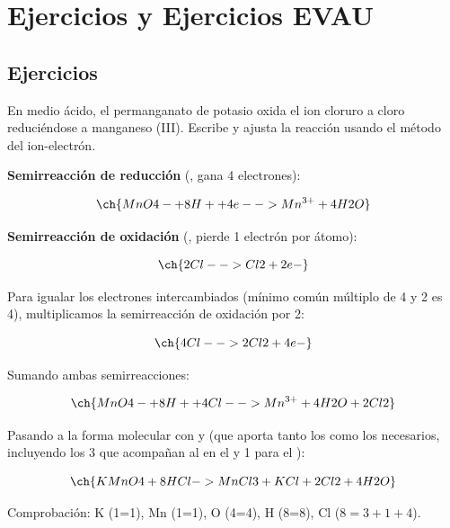 

\section{Ejercicios y Ejercicios EVAU}

\subsection{Ejercicios}


\begin{exercise}
    En medio ácido, el permanganato de potasio oxida el ion cloruro a cloro reduciéndose a manganeso (III). Escribe y ajusta la reacción usando el método del ion-electrón.
    \begin{solu}

        \textbf{Semirreacción de reducción} (, gana 4 electrones):

        \begin{equation*}
            \ch{MnO4- + 8 H+ + 4 e- -> Mn^{3+} + 4 H2O}
        \end{equation*}

        \textbf{Semirreacción de oxidación} (, pierde 1 electrón por átomo):

        \begin{equation*}
            \ch{2 Cl- -> Cl2 + 2 e-}
        \end{equation*}

        Para igualar los electrones intercambiados (mínimo común múltiplo de 4 y 2 es 4), multiplicamos la semirreacción de oxidación por 2:

        \begin{equation*}
            \ch{4 Cl- -> 2 Cl2 + 4 e-}
        \end{equation*}

        Sumando ambas semirreacciones:

        \begin{equation*}
            \ch{MnO4- + 8 H+ + 4 Cl- -> Mn^{3+} + 4 H2O + 2 Cl2}
        \end{equation*}

        Pasando a la forma molecular con  y  (que aporta tanto los  como los  necesarios, incluyendo los 3  que acompañan al  en el  y 1  para el ):

        \begin{equation*}
            \ch{KMnO4 + 8 HCl -> MnCl3 + KCl + 2 Cl2 + 4 H2O}
        \end{equation*}

        Comprobación: K (1=1), Mn (1=1), O (4=4), H (8=8), Cl (\(8 = 3+1+4\)).

    \end{solu}
\end{exercise}

